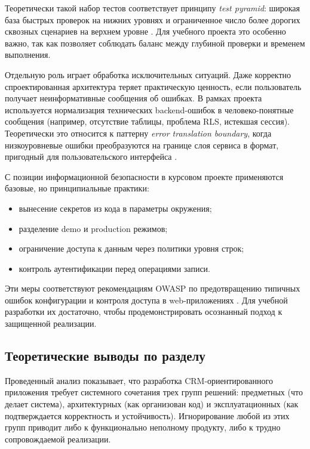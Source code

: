 Теоретически такой набор тестов соответствует принципу \textit{test pyramid}: широкая база быстрых проверок на нижних уровнях и ограниченное число более дорогих сквозных сценариев на верхнем уровне \cite{testingBook}. Для учебного проекта это особенно важно, так как позволяет соблюдать баланс между глубиной проверки и временем выполнения.

Отдельную роль играет обработка исключительных ситуаций. Даже корректно спроектированная архитектура теряет практическую ценность, если пользователь получает неинформативные сообщения об ошибках. В рамках проекта используется нормализация технических backend-ошибок в человеко-понятные сообщения (например, отсутствие таблицы, проблема RLS, истекшая сессия). Теоретически это относится к паттерну \textit{error translation boundary}, когда низкоуровневые ошибки преобразуются на границе слоя сервиса в формат, пригодный для пользовательского интерфейса \cite{cleanArchitecture,patternsBook}.

С позиции информационной безопасности в курсовом проекте применяются базовые, но принципиальные практики:
\begin{itemize}
  \item вынесение секретов из кода в параметры окружения;
  \item разделение demo и production режимов;
  \item ограничение доступа к данным через политики уровня строк;
  \item контроль аутентификации перед операциями записи.
\end{itemize}

Эти меры соответствуют рекомендациям OWASP по предотвращению типичных ошибок конфигурации и контроля доступа в web-приложениях \cite{owaspM4,owaspM1}. Для учебной разработки их достаточно, чтобы продемонстрировать осознанный подход к защищенной реализации.

\subsection{Теоретические выводы по разделу}

Проведенный анализ показывает, что разработка CRM-ориентированного приложения требует системного сочетания трех групп решений: предметных (что делает система), архитектурных (как организован код) и эксплуатационных (как подтверждается корректность и устойчивость). Игнорирование любой из этих групп приводит либо к функционально неполному продукту, либо к трудно сопровождаемой реализации.

